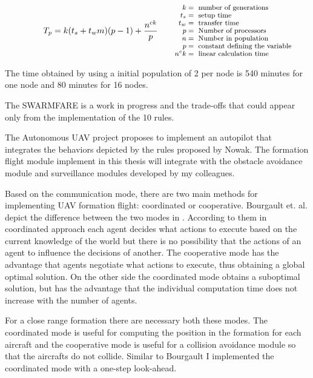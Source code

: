 \begin{equation}
T_{p} = k (t_{s}+t_{w}m)(p-1) + \frac{n^{ck}}{p}
\qquad\parbox{4.0cm}{\footnotesize$\begin{aligned} 
 k &= \text{ number of generations}
  \\[-1.0ex] t_{s} &= \text{ setup time}
  \\[-1.0ex] t_{w} &= \text{ transfer time}
  \\[-1.0ex] p &= \text{ Number of processors}
  \\[-1.0ex] n &= \text{ Number in population}
  \\[-1.0ex] p &= \text{ constant defining the variable}
  \\[-1.0ex] n^ck &= \text{ linear calculation time}
\end{aligned}$}
\label{eqn: nowak-paralel-time}
\end{equation}

The time obtained by using a initial population of 2 per node
is 540 minutes for one node and 80 minutes for 16 nodes.

The SWARMFARE is a work in progress and the trade-offs that could appear only
from the implementation of the 10 rules. 

The Autonomous UAV project proposes to implement an autopilot that integrates
the behaviors depicted by the rules proposed by Nowak. The formation flight module
implement in this thesis will integrate with the obstacle avoidance module and
surveillance modules developed by my colleagues.

Based on the communication mode,  there are two main methods for implementing 
UAV formation flight: coordinated or cooperative. Bourgault et. al. depict the
difference between the two modes in \cite{bayesian}. According to them
in coordinated approach each agent decides what actions to execute based
on the current knowledge of the world but there is no possibility that the actions
of an agent to influence the decisions of another. The cooperative mode has the
advantage that agents negotiate what actions to execute, thus obtaining a 
global optimal solution. On the other side the coordinated mode obtains a 
suboptimal solution, but has the advantage that the individual computation 
time does not increase with the number of agents.

For a close range formation there are necessary both these modes. The coordinated
mode is useful for computing the position in the formation for each aircraft 
and the cooperative mode is useful for a collision avoidance module so that
the aircrafts do not collide. Similar to Bourgault I implemented the coordinated
mode with a one-step look-ahead.


